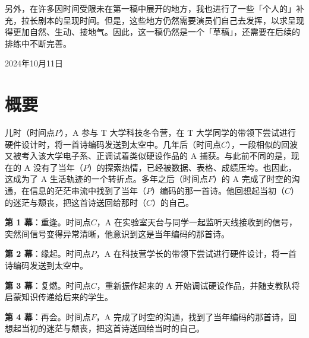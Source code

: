 \documentclass[10pt, a5paper, oneside]{memoir}
\begin{document}
另外，在许多因时间受限未在第一稿中展开的地方，我也进行了一些「个人的」补充，拉长剧本的呈现时间。但是，这些地方仍然需要演员们自己去发挥，以求呈现得更加自然、生动、接地气。因此，这一稿仍然是一个「草稿」，还需要在后续的排练中不断完善。

{\hfill\kai 2024年10月11日}




\clearpage

\chapter*{概要}

儿时（时间点\(P\)），A 参与 T 大学科技冬令营，在 T 大学同学的带领下尝试进行硬件设计时，将一首诗编码发送到太空中。几年后（时间点\(C\)），一段相似的回波又被考入该大学电子系、正调试着类似硬设作品的 A 捕获。与此前不同的是，现在的 A 没有了当年（\(P\)）的探索热情，已经被数据、表格、成绩压垮。也因此，这成为了 A 生活轨迹的一个转折点。多年之后（时间点\(F\)）的 A 完成了时空的沟通，在信息的茫茫串流中找到了当年（\(P\)）编码的那一首诗。他回想起当初（\(C\)）的迷茫与颓丧，把这首诗送回给那时（\(C\)）的自己。

\textbf{第 1 幕}：重逢。时间点\(C\)，A 在实验室天台与同学一起监听天线接收到的信号，突然间信号变得异常清晰，他意识到这是当年编码的那首诗。

\textbf{第 2 幕}：缘起。时间点\(P\)，A 在科技营学长的带领下尝试进行硬件设计，将一首诗编码发送到太空中。

\textbf{第 3 幕}：复燃。时间点\(C\)，重新振作起来的 A 开始调试硬设作品，并随支教队将启蒙知识传递给后来的学生。

\textbf{第 4 幕}：再会。时间点\(F\)，A 完成了时空的沟通，找到了当年编码的那首诗，回想起当初的迷茫与颓丧，把这首诗送回给当时的自己。
\end{document}
